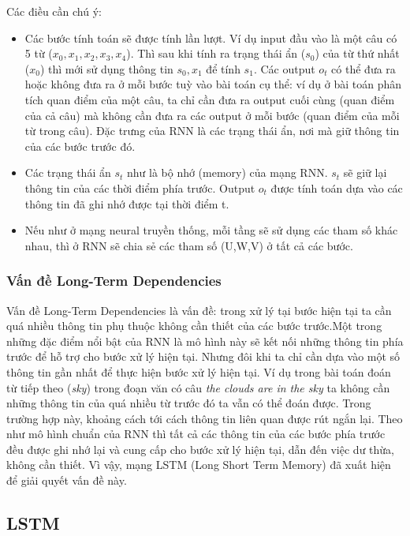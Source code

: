 \documentclass[a4paper,12pt]{report}
\begin{document}
Các điều cần chú ý:
\begin{itemize}
\item Các bước tính toán sẽ được tính lần lượt. Ví dụ input đầu vào là một câu có 5 từ ($x_0, x_1, x_2, x_3, x_4$). Thì sau khi tính ra trạng thái ẩn ($s_0$) của từ thứ nhất ($x_0$) thì mới sử dụng thông tin $s_0, x_1$ để tính $s_1$. Các output $o_t$ có thể đưa ra hoặc không đưa ra ở mỗi bước tuỳ vào bài toán cụ thể: ví dụ ở bài toán phân tích quan điểm của một câu, ta chỉ cần đưa ra output cuối cùng (quan điểm của cả câu) mà không cần đưa ra các output ở mỗi bước (quan điểm của mỗi từ trong câu). Đặc trưng của RNN là các trạng thái ẩn, nơi mà giữ thông tin của các bước trước đó.  
\item Các trạng thái ẩn $s_t$ như là bộ nhớ (memory) của mạng RNN. $s_t$ sẽ giữ lại thông tin của các thời điểm phía trước. Output $o_t$ được tính toán dựa vào các thông tin đã ghi nhớ được tại thời điểm t.
\item Nếu như ở mạng neural truyền thống, mỗi tầng sẽ sử dụng các tham số khác nhau, thì ở RNN sẽ chia sẻ các tham số (U,W,V) ở tất cả các bước.
\end{itemize}

\subsubsection{Vấn đề Long-Term Dependencies}
Vấn đề  Long-Term Dependencies là vấn đề: trong xử lý tại bước hiện tại ta cần quá nhiều thông tin phụ thuộc không cần thiết của các bước trước.Một trong những đặc điểm nổi bật của RNN là mô hình này sẽ kết nối những thông tin phía trước để hỗ trợ cho bước xử lý hiện tại. Nhưng đôi khi ta chỉ cần dựa vào một số thông tin gần nhất để thực hiện bước xử lý hiện tại. Ví dụ trong bài toán đoán từ tiếp theo (\emph{sky}) trong đoạn văn có câu \emph{the clouds are in the sky} ta không cần những thông tin của quá nhiều từ trước đó ta vẫn có thể đoán được. Trong trường hợp này, khoảng cách tới cách thông tin liên quan được rút ngắn lại. Theo như mô hình chuẩn của RNN thì tất cả các thông tin của các bước phía trước đều được ghi nhớ lại và cung cấp cho bước xử lý hiện tại, dẫn đến việc dư thừa, không cần thiết. Vì vậy, mạng LSTM (Long Short Term Memory) đã xuất hiện để giải quyết vấn đề này.

\subsection{LSTM}
\end{document}
